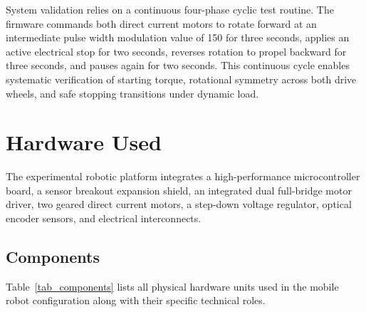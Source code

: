 \documentclass[11pt,a4paper]{article}
\begin{document}
System validation relies on a continuous four-phase cyclic test routine. The firmware commands both direct current motors to rotate forward at an intermediate pulse width modulation value of 150 for three seconds, applies an active electrical stop for two seconds, reverses rotation to propel backward for three seconds, and pauses again for two seconds. This continuous cycle enables systematic verification of starting torque, rotational symmetry across both drive wheels, and safe stopping transitions under dynamic load.

\section{Hardware Used}
The experimental robotic platform integrates a high-performance microcontroller board, a sensor breakout expansion shield, an integrated dual full-bridge motor driver, two geared direct current motors, a step-down voltage regulator, optical encoder sensors, and electrical interconnects.

\subsection{Components}
Table~\ref{tab_components} lists all physical hardware units used in the mobile robot configuration along with their specific technical roles.
\end{document}
